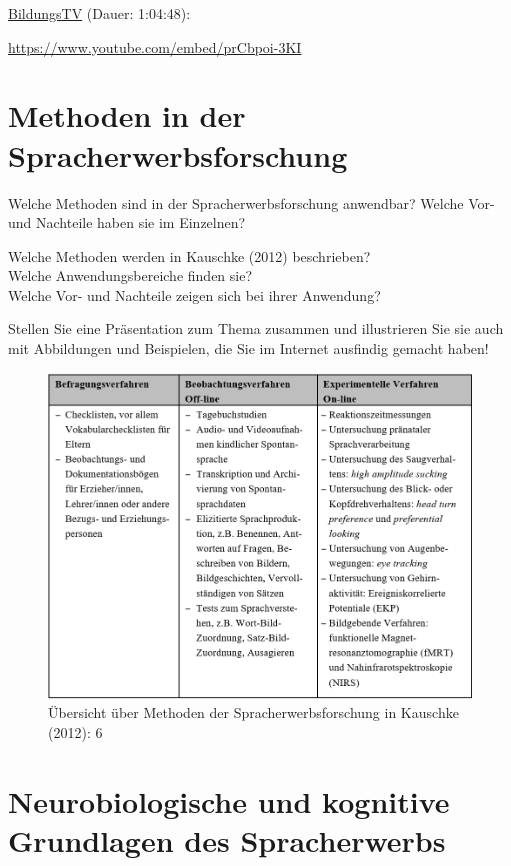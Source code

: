 \documentclass[
  letterpaper,
]{scrbook}
\begin{document}
\href{https://www.youtube.com/watch?v=prCbpoi-3KI}{BildungsTV} (Dauer:
1:04:48):

\url{https://www.youtube.com/embed/prCbpoi-3KI}

\hypertarget{sec-spracherwerb}{%
\chapter{Methoden in der
Spracherwerbsforschung}\label{sec-spracherwerb}}

Welche Methoden sind in der Spracherwerbsforschung anwendbar? Welche
Vor- und Nachteile haben sie im Einzelnen?

Welche Methoden werden in Kauschke (2012) beschrieben?\\
Welche Anwendungsbereiche finden sie?\\
Welche Vor- und Nachteile zeigen sich bei ihrer Anwendung?

Stellen Sie eine Präsentation zum Thema zusammen und illustrieren Sie
sie auch mit Abbildungen und Beispielen, die Sie im Internet ausfindig
gemacht haben!

\begin{figure}

{\centering \includegraphics[width=1\textwidth,height=\textheight]{./pictures/methoden.png}

}

\caption{Übersicht über Methoden der Spracherwerbsforschung in Kauschke
(2012): 6}

\end{figure}

\hypertarget{sec-neuro}{%
\chapter{Neurobiologische und kognitive Grundlagen des
Spracherwerbs}\label{sec-neuro}}
\end{document}
